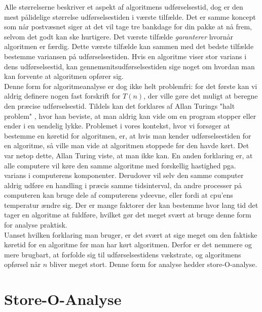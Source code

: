 Alle størrelserne beskriver et aspekt af algoritmens udførselsestid, dog er den mest pålidelige størrelse udførselsestiden i værste tilfælde. Det er samme koncept som når postvæsnet siger at det vil tage tre bankdage for din pakke at nå frem, selvom det godt kan ske hurtigere. Det værste tilfælde \emph{garanterer} hvornår algoritmen er færdig. Dette værste tilfælde kan sammen med det bedste tilfælde bestemme variansen på udførselsestiden. Hvis en algoritme viser stor varians i dens udførselsestid, kan gennemsnitsudførselsestiden sige noget om hvordan man kan forvente at algoritmen opfører sig.\\

Denne form for algoritmeanalyse er dog ikke helt problemfri: for det første kan vi aldrig definere nogen fast forskrift for $T(n)$, der ville gøre det muligt at beregne den præcise udførselsestid. Tildels kan det forklares af Allan Turings "halt problem" \cite{halting-problem}, hvor han beviste, at man aldrig kan vide om en program stopper eller ender i en uendelig lykke. Problemet i vores kontekst, hvor vi forsøger at bestemme en køretid for algoritmen, er, at hvis man kender udførselsestiden for en algoritme, så ville man vide at algoritmen stoppede før den havde kørt. Det var netop dette, Allan Turing viste, at man ikke kan. En anden forklaring er, at alle computere vil køre den samme algoritme med forskellig hastighed pga. varians i computerens komponenter. Derudover vil selv den samme computer aldrig udføre en handling i præcis samme tidsinterval, da andre processer på computeren kan bruge dele af computerens ydeevne, eller fordi at cpu'ens temperatur ændre sig. Der er mange faktorer der kan bestemme hvor lang tid det tager en algoritme at fuldføre, hvilket gør det meget svært at bruge denne form for analyse praktisk.\\

Uanset hvilken forklaring man bruger, er det svært at sige meget om den faktiske køretid for en algoritme før man har kørt algoritmen. Derfor er det nemmere og mere brugbart, at forfolde sig til udførselsestidens vækstrate, og algoritmens opførsel når $n$ bliver meget stort. Denne form for analyse hedder store-O-analyse.

\section{Store-O-Analyse}
\label{sec:Store-O-Analyse}

